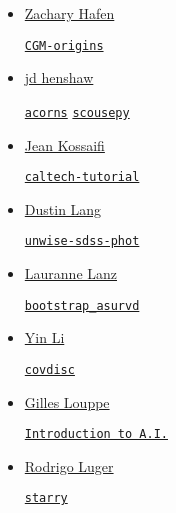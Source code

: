 \documentclass[11pt,a4paper]{article}
\begin{document}
\begin{itemize}
\begin{itemize}
  \end{itemize}

\item \href{https://github.com/zhafen/}{Zachary Hafen} 
  \begin{itemize}
    \href{https://github.com/zhafen/CGM-origins}{\tt CGM-origins}
  \end{itemize}

\item \href{https://github.com/jdhenshaw}{jd henshaw}
  \begin{itemize}
    \href{https://github.com/jdhenshaw/acorns}{\tt acorns}
    \href{https://github.com/jdhenshaw/scousepy}{\tt scousepy}
  \end{itemize}

\item \href{https://github.com/JeanKossaifi}{Jean Kossaifi}
  \begin{itemize}
    \href{https://github.com/JeanKossaifi/caltech-tutorial}{{\tt caltech-tutorial}}
  \end{itemize}
  
\item \href{https://github.com/dstndstn}{Dustin Lang}
  \begin{itemize}
   \href{https://github.com/dstndstn/unwise-sdss-phot}{\tt unwise-sdss-phot}
   \end{itemize}

\item \href{https://github.com/lalanz/}{Lauranne Lanz}
  \begin{itemize}
    \href{https://github.com/lalanz/bootstrap\_asurv}{\tt bootstrap\_asurvd}
  \end{itemize}

\item \href{https://github.com/eelregit/}{Yin Li} 
  \begin{itemize}
    \href{https://github.com/eelregit/covdisc}{\tt covdisc}
  \end{itemize}

\item \href{https://github.com/glouppe}{Gilles Louppe}
  \begin{itemize}
    \href{https://github.com/glouppe/info8006-introduction-to-ai}{\tt  Introduction to A.I.}
  \end{itemize}

\item \href{https://github.com/rodluger}{Rodrigo Luger}
  \begin{itemize}
    \href{https://github.com/rodluger/starry}{{\tt starry}}
  \end{itemize}


\end{itemize}
\end{document}
